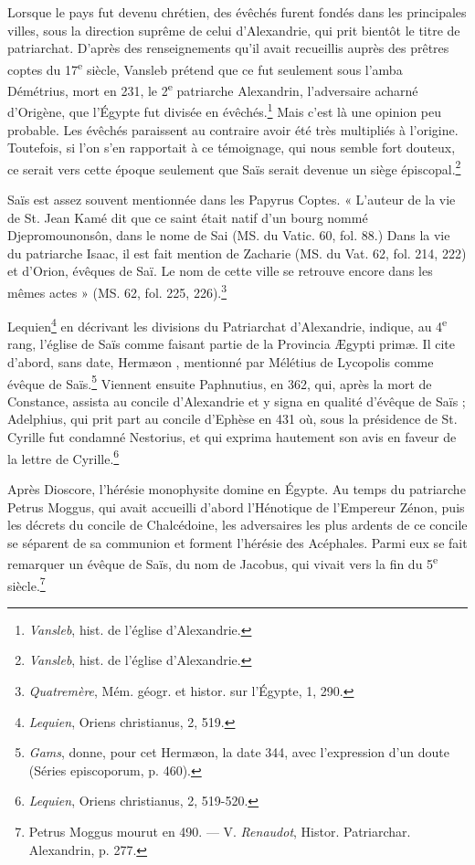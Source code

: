 \documentclass[a4paper, 11pt, oneside]{article}
\begin{document}
Lorsque le pays fut devenu chrétien, des évêchés furent fondés dans les principales villes, sous la direction suprême de celui d'Alexandrie, qui prit bientôt le titre de patriarchat. D'après des renseignements qu'il avait recueillis auprès des prêtres coptes du 17\textsuperscript{e} siècle, Vansleb prétend que ce fut seulement sous l'amba Démétrius, mort en 231, le 2\textsuperscript{e} patriarche Alexandrin, l'adversaire acharné d'Origène, que l'Égypte fut divisée en évêchés.\footnote{\emph{Vansleb}, hist. de l'église d'Alexandrie.} Mais c'est là une opinion peu probable. Les évêchés paraissent au contraire avoir été très multipliés à l'origine. Toutefois, si l'on s'en rapportait à ce témoignage, qui nous semble fort douteux, ce serait vers cette époque seulement que Saïs serait devenue un siège épiscopal.\footnote{\emph{Vansleb}, hist. de l'église d'Alexandrie.}

Saïs est assez souvent mentionnée dans les Papyrus Coptes. « L'auteur de la vie de St. Jean Kamé dit que ce saint était natif d'un bourg nommé Djepromounonsôn, dans le nome de Sai (MS. du Vatic. 60, fol. 88.) Dans la vie du patriarche Isaac, il est fait mention de Zacharie (MS. du Vat. 62, fol. 214, 222) et d'Orion, évêques de Saï. Le nom de cette ville se retrouve encore dans les mêmes actes » (MS. 62, fol. 225, 226).\footnote{\emph{Quatremère}, Mém. géogr. et histor. sur l'Égypte, 1, 290.}

Lequien\footnote{\emph{Lequien}, Oriens christianus, 2, 519.} en décrivant les divisions du Patriarchat d'Alexandrie, indique, au 4\textsuperscript{e} rang, l'église de Saïs comme faisant partie de la Provincia Ægypti primæ. Il cite d'abord, sans date, Hermæon , mentionné par Mélétius de Lycopolis comme évêque de Saïs.\footnote{\emph{Gams}, donne, pour cet Hermæon, la date 344, avec l'expression d'un doute (Séries episcoporum, p. 460).} Viennent ensuite Paphnutius, en 362, qui, après la mort de Constance, assista au concile d'Alexandrie et y signa en qualité d'évêque de Saïs ; Adelphius, qui prit part au concile d'Ephèse en 431 où, sous la présidence de St. Cyrille fut condamné Nestorius, et qui exprima hautement son avis en faveur de la lettre de Cyrille.\footnote{\emph{Lequien}, Oriens christianus, 2, 519-520.}

Après Dioscore, l'hérésie monophysite domine en Égypte. Au temps du patriarche Petrus Moggus, qui avait accueilli d'abord l'Hénotique de l'Empereur Zénon, puis les décrets du concile de Chalcédoine, les adversaires les plus ardents de ce concile se séparent de sa communion et forment l'hérésie des Acéphales. Parmi eux se fait remarquer un évêque de Saïs, du nom de Jacobus, qui vivait vers la fin du 5\textsuperscript{e} siècle.\footnote{Petrus Moggus mourut en 490. --- V. \emph{Renaudot}, Histor. Patriarchar. Alexandrin, p. 277.}
\end{document}

